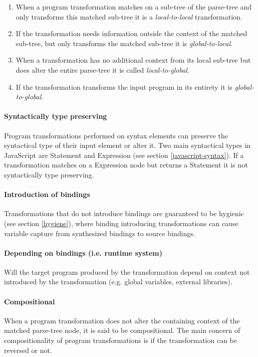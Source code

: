 \begin{enumerate}
	\item When a program transformation matches on a sub-tree of the parse-tree and only transforms this matched sub-tree it is a \textit{local-to-local} transformation. 
	\item If the transformation needs information outside the context of the matched sub-tree, but only transforms the matched sub-tree it is \textit{global-to-local}. 
	\item When a transformation has no additional context from its local sub-tree but does alter the entire parse-tree it is called \textit{local-to-global}. 
	\item If the transformation transforms the input program in its entirety it is \textit{global-to-global}.
\end{enumerate}

\paragraph{Syntactically type preserving}
Program transformations performed on syntax elements can preserve the syntactical type of their input element or alter it. Two main syntactical types in JavaScript are Statement and Expression (see section \ref{javascript-syntax}). If a transformation matches on a Expression node but returns a Statement it is not syntactically type preserving.

\paragraph{Introduction of bindings}
Transformations that do not introduce bindings are guaranteed to be hygienic (see section \ref{hygiene}), where binding introducing transformations can cause variable capture from synthesized bindings to source bindings.

\paragraph{Depending on bindings (i.e. runtime system)}
Will the target program produced by the transformation depend on context not introduced by the transformation (e.g. global variables, external libraries).

\paragraph{Compositional}
When a program transformation does not alter the containing context of the matched parse-tree node, it is said to be compositional. The main concern of compositionality of program transformations is if the transformation can be reversed or not.

